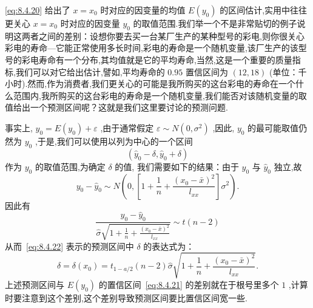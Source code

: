 \eqref{eq:8.4.20} 给出了 $x=x_0$ 时对应的因变量的均值 $E(y_0)$ 的区间估计,实用中往往更关心 $x=x_0$ 时对应的因变量 $y_0$ 的取值范围.我们举一个不是非常贴切的例子说明这两者之间的差别：设想你要去买一台某厂生产的某种型号的彩电,则你很关心彩电的寿命—它能正常使用多长时间,彩电的寿命是一个随机变量,该厂生产的该型号的彩电寿命有一个分布,其均值就是它的平均寿命,当然,这是一个重要的质量指标,我们可以对它给出估计,譬如,平均寿命的 $0.95$ 置信区间为 $(12,18)$ (单位：千小时).然而,作为消费者,我们更关心的可能是我所购买的这台彩电的寿命在一个什么范围内,我所购买的这台彩电的寿命是一个随机变量,我们能否对该随机变量的取值给出一个预测区间呢？这就是我们这里要讨论的预测问题.

事实上, $y_0=E(y_0)+\varepsilon$ ,由于通常假定 $\varepsilon\sim N(0,\sigma^2)$ ,因此, $y_0$ 的最可能取值仍然为 $y_0$ ,于是,我们可以使用以列为中心的一个区间
\begin{equation}\label{eq:8.4.22}
\left( \hat{y}_0-\delta ,\hat{y}_0+\delta \right)
\end{equation}
作为 $y_0$ 的取值范围,为确定 $\delta$ 的值, 我们需要如下的结果：由于 $y_0$ 与 $\hat{y}_0$ 独立,故
\begin{equation*}
y_{0}-\hat{y}_{0} \sim N\left(0,\left[1+\frac{1}{n}+\frac{\left(x_{0}-\bar{x}\right)^{2}}{l_{x x}}\right]\sigma^2\right).
\end{equation*}
因此有
\begin{equation*}
\frac{y_{0}-\hat{y}_{0}}{\hat{\sigma} \sqrt{1+\frac{1}{n}+\frac{\left(x_{0}-\bar{x}\right)^{2}}{l_{x x}}}} \sim t(n-2)
\end{equation*}
从而~\eqref{eq:8.4.22} 表示的预测区间中 $\delta$ 的表达式为：
\begin{equation}
\delta=\delta\left(x_{0}\right)=t_{1-a / 2}(n-2) \hat{\sigma} \sqrt{1+\frac{1}{n}+\frac{\left(x_{0}-\bar{x}\right)^{2}}{l_{x x}}}.\label{eq:8.4.23}
\end{equation}
上述预测区间与 $E(y_0)$ 的置信区间~\eqref{eq:8.4.21} 的差别就在于根号里多个 $1$ ,计算时要注意到这个差别,这个差别导致预测区间要比置信区间宽一些.

